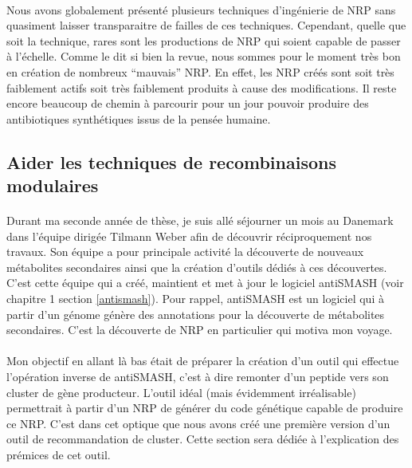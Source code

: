 \documentclass[12pt,french,twoside]{report}
\begin{document}
\paragraph{}Nous avons globalement présenté plusieurs techniques d'ingénierie de NRP sans quasiment laisser transparaitre de failles de ces techniques.
Cependant, quelle que soit la technique, rares sont les productions de NRP qui soient capable de passer à l'échelle.
Comme le dit si bien la revue, nous sommes pour le moment très bon en création de nombreux ``mauvais'' NRP.
En effet, les NRP créés sont soit très faiblement actifs soit très faiblement produits à cause des modifications.
Il reste encore beaucoup de chemin à parcourir pour un jour pouvoir produire des antibiotiques synthétiques issus de la pensée humaine.


\subsection{Aider les techniques de recombinaisons modulaires}

\paragraph{}Durant ma seconde année de thèse, je suis allé séjourner un mois au Danemark dans l'équipe dirigée Tilmann Weber afin de découvrir réciproquement nos travaux.
Son équipe a pour principale activité la découverte de nouveaux métabolites secondaires ainsi que la création d'outils dédiés à ces découvertes.
C'est cette équipe qui a créé, maintient et met à jour le logiciel antiSMASH (voir chapitre 1 section \ref{antismash}).
Pour rappel, antiSMASH est un logiciel qui à partir d'un génome génère des annotations pour la découverte de métabolites secondaires.
C'est la découverte de NRP en particulier qui motiva mon voyage.

\paragraph{}Mon objectif en allant là bas était de préparer la création d'un outil qui effectue l'opération inverse de antiSMASH, c'est à dire remonter d'un peptide vers son cluster de gène producteur.
L'outil idéal (mais évidemment irréalisable) permettrait à partir d'un NRP de générer du code génétique capable de produire ce NRP.
C'est dans cet optique que nous avons créé une première version d'un outil de recommandation de cluster.
Cette section sera dédiée à l'explication des prémices de cet outil.
\end{document}
